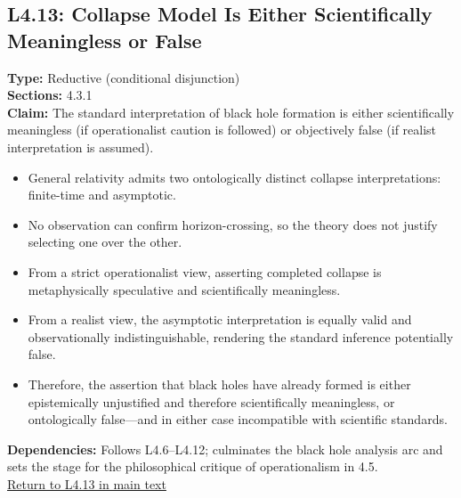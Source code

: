 \documentclass[12pt]{book}
\newcommand{\returnlink}[1]{\hyperref[logic:#1]{Return to #1 in main text}\xspace}
\begin{document}
\subsection*{L4.13: Collapse Model Is Either Scientifically Meaningless or False}
\label{appendix:L4.13}
\textbf{Type:} Reductive (conditional disjunction) \\
\textbf{Sections:} 4.3.1 \\
\textbf{Claim:} The standard interpretation of black hole formation is either scientifically meaningless (if operationalist caution is followed) or objectively false (if realist interpretation is assumed).
\begin{itemize}
  \item General relativity admits two ontologically distinct collapse interpretations: finite-time and asymptotic.
  \item No observation can confirm horizon-crossing, so the theory does not justify selecting one over the other.
  \item From a strict operationalist view, asserting completed collapse is metaphysically speculative and scientifically meaningless.
  \item From a realist view, the asymptotic interpretation is equally valid and observationally indistinguishable, rendering the standard inference potentially false.
  \item Therefore, the assertion that black holes have already formed is either epistemically unjustified and therefore scientifically meaningless, or ontologically false---and in either case incompatible with scientific standards.
\end{itemize}
\textbf{Dependencies:} Follows L4.6–L4.12; culminates the black hole analysis arc and sets the stage for the philosophical critique of operationalism in 4.5. \\
\returnlink{L4.13}
\end{document}
